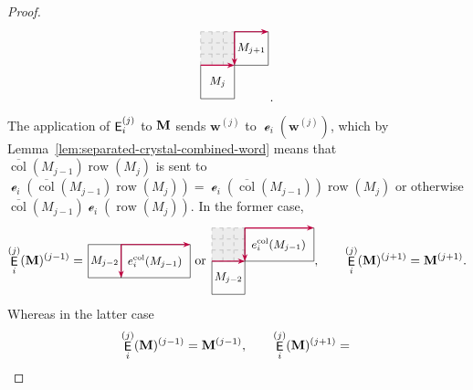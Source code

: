 \documentclass[12pt]{amsart}
\newcommand{\bs}{\boldsymbol}
\DeclareMathOperator{\worde}{{\mathcal e}}
\DeclareMathOperator{\mate}{\sf E}
\newcommand{\cell}{.28}
\newcommand{\phantomtile}[5]{%
\begin{scope}[shift={(#1,#2)}]
  \fill[gray!15] (0,0) rectangle ({#3*\cell},{#4*\cell});
  \draw[gray!70, dashed, step=\cell] (0,0) grid ({#3*\cell},{#4*\cell});
  #5
\end{scope}
}
\theoremstyle{definition}
\theoremstyle{remark}
\begin{document}
\begin{proof}
\[{{\begin{tikzpicture}[scale=1.1, baseline=-.5ex]
\draw (0,0) rectangle (.84,.84);
\node at (.42,.42) {\small{$M_{j}$}};

{\phantomtile{0}{.84}{3}{3}{
}}

\draw (.84,.84) rectangle (1.68,1.68);
\node at (1.26,1.26) {\small{$M_{j+1}$}};


\draw[purple, -{Stealth[length=2mm,width=1.5mm]}, thick] (0,.84) -- (.84,.84);
\draw[purple, -{Stealth[length=2mm,width=1.5mm]}, thick] (.84,1.68) -- (.84,.84);
\draw[purple, -{Stealth[length=2mm,width=1.5mm]}, thick] (.84,1.68) -- (1.68,1.68);
\end{tikzpicture}}}.\]
The application of $\mate_i^{(j)}$ to ${\bf M}$ sends ${\bs w}^{(j)}$ to $\worde_i({\bs w}^{(j)})$, which by Lemma~\ref{lem:separated-crystal-combined-word} means that $\overline{\operatorname{col}}(M_{j-1})\operatorname{row}(M_j)$ is sent to $\worde_i(\overline{\operatorname{col}}(M_{j-1})\operatorname{row}(M_j)) = \worde_i(\overline{\operatorname{col}}(M_{j-1}))\operatorname{row}(M_j)$ or  otherwise
$\overline{\operatorname{col}}(M_{j-1})\worde_i(\operatorname{row}(M_j))$. In the former case,
\[
\mate_i^{(j)}({\bf M})^{(j-1)} =
\vcenter{\hbox{\begin{tikzpicture}[scale=1.1, baseline=-.5ex]

\draw (0,0) rectangle (.84,.84);
\node at (.42,.42) {\small{$M_{j-2}$}};

\draw (.84,0) rectangle (2.60,.84);
\node at (1.70,0.42) {\small{$e_i^{\mathrm{col}}(M_{j-1})$}};
\draw[purple, -{Stealth[length=2mm,width=1.5mm]}, thick] (.84,.84) -- (.84,0);
\draw[purple, -{Stealth[length=2mm,width=1.5mm]}, thick] (.84,.84) -- (2.60,.84);
\end{tikzpicture}}}
\, \, \text{or}\, \,
\vcenter{\hbox{\begin{tikzpicture}[scale=1.1, baseline=-.5ex]

\draw (0,0) rectangle (.84,.84);
\node at (.42,.42) {\small{$M_{j-2}$}};

{\phantomtile{0}{.84}{3}{3}{
}}

\draw (.84,.84) rectangle (2.60,1.68);
\node at (1.70,1.26) {\small{$e_i^{\mathrm{col}}(M_{j-1})$}};


\draw[purple, -{Stealth[length=2mm,width=1.5mm]}, thick] (0,.84) -- (.84,.84);
\draw[purple, -{Stealth[length=2mm,width=1.5mm]}, thick] (.84,1.68) -- (.84,.84);
\draw[purple, -{Stealth[length=2mm,width=1.5mm]}, thick] (.84,1.68) -- (2.60,1.68);
\end{tikzpicture}}},
\qquad
\mate_i^{(j)}({\bf M})^{(j+1)} ={\bf M}^{(j+1)}.
\]
Whereas in the latter case 
\[
\mate_i^{(j)}({\bf M})^{(j-1)} ={\bf M}^{(j-1)},
\qquad
\mate_i^{(j)}({\bf M})^{(j+1)} =\vcenter{\hbox{\begin{tikzpicture}[scale=1.1, baseline=-.5ex]


\end{tikzpicture}}}\]
\end{proof}
\end{document}
